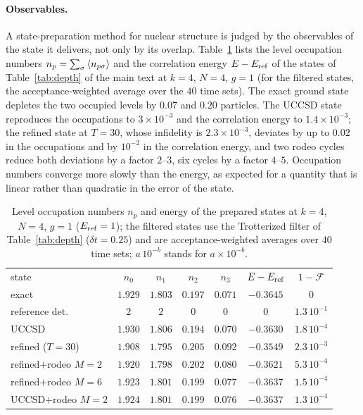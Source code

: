 \documentclass[aps,prc,reprint,superscriptaddress,floatfix,nofootinbib]{revtex4-2}
\begin{document}
\paragraph{Observables.}
A state-preparation method for nuclear structure is judged by the observables
of the state it delivers, not only by its overlap.  Table~\ref{tab:obs} lists
the level occupation numbers $n_p=\sum_\sigma\expval{n_{p\sigma}}$ and the
correlation energy $E-E_{\rm ref}$ of the states of Table~\ref{tab:depth} of the main text at
$k=4$, $N=4$, $g=1$ (for the filtered states, the acceptance-weighted average
over the $40$ time sets).  The exact ground state depletes the two occupied
levels by $0.07$ and $0.20$ particles.  The UCCSD state reproduces the
occupations to $3\times10^{-3}$ and the correlation energy to $1.4\times10^{-3}$;
the refined state at $T=30$, whose infidelity is $2.3\times10^{-3}$, deviates by
up to $0.02$ in the occupations and by $10^{-2}$ in the correlation energy,
and two rodeo cycles reduce both deviations by a factor $2$--$3$, six cycles by
a factor $4$--$5$.  Occupation numbers converge more slowly than the energy,
as expected for a quantity that is linear rather than quadratic in the error
of the state.

\begin{table}[t]
\caption{\label{tab:obs}Level occupation numbers $n_p$ and energy of the
prepared states at $k=4$, $N=4$, $g=1$ ($E_{\rm ref}=1$); the filtered states
use the Trotterized filter of Table~\ref{tab:depth} ($\delta t=0.25$) and are
acceptance-weighted averages over $40$ time sets; $a\,10^{-b}$ stands for
$a\times10^{-b}$.}
\footnotesize
\begin{ruledtabular}
\begin{tabular}{lcccccc}
state & $n_0$ & $n_1$ & $n_2$ & $n_3$ & $E-E_{\rm ref}$ & $1-\mathcal F$\\
\colrule
exact & $1.929$ & $1.803$ & $0.197$ & $0.071$ & $-0.3645$ & $0$\\
reference det. & $2$ & $2$ & $0$ & $0$ & $0$ & $1.3\,10^{-1}$\\
UCCSD & $1.930$ & $1.806$ & $0.194$ & $0.070$ & $-0.3630$ & $1.8\,10^{-4}$\\
refined ($T{=}30$) & $1.908$ & $1.795$ & $0.205$ & $0.092$ & $-0.3549$ & $2.3\,10^{-3}$\\
refined$+$rodeo $M{=}2$ & $1.920$ & $1.798$ & $0.202$ & $0.080$ & $-0.3621$ & $5.3\,10^{-4}$\\
refined$+$rodeo $M{=}6$ & $1.923$ & $1.801$ & $0.199$ & $0.077$ & $-0.3637$ & $1.5\,10^{-4}$\\
UCCSD$+$rodeo $M{=}2$ & $1.924$ & $1.801$ & $0.199$ & $0.076$ & $-0.3637$ & $1.3\,10^{-4}$\\
\end{tabular}
\end{ruledtabular}
\end{table}
\end{document}
